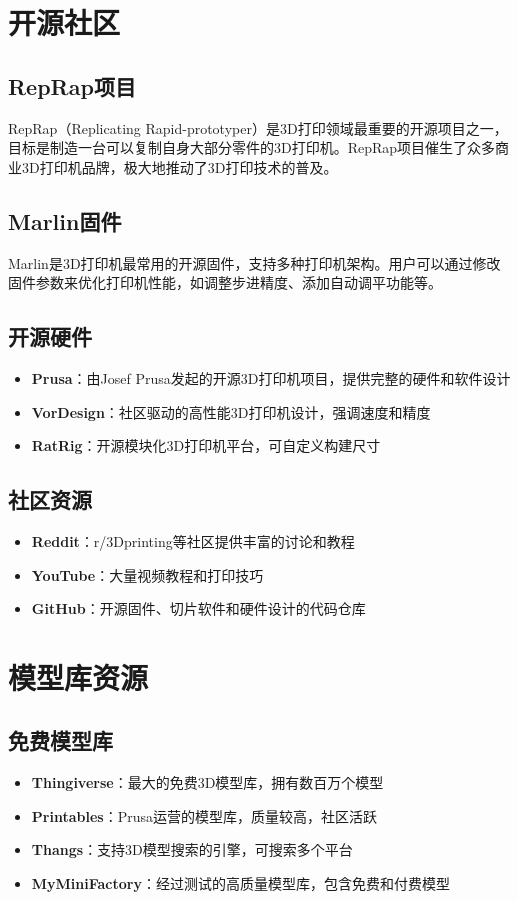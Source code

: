 \documentclass[12pt,UTF8]{ctexbook}
\begin{document}
\section{开源社区}

\subsection{RepRap项目}
RepRap（Replicating Rapid-prototyper）是3D打印领域最重要的开源项目之一，目标是制造一台可以复制自身大部分零件的3D打印机。RepRap项目催生了众多商业3D打印机品牌，极大地推动了3D打印技术的普及。

\subsection{Marlin固件}
Marlin是3D打印机最常用的开源固件，支持多种打印机架构。用户可以通过修改固件参数来优化打印机性能，如调整步进精度、添加自动调平功能等。

\subsection{开源硬件}
\begin{itemize}
\item \textbf{Prusa}：由Josef Prusa发起的开源3D打印机项目，提供完整的硬件和软件设计
\item \textbf{VorDesign}：社区驱动的高性能3D打印机设计，强调速度和精度
\item \textbf{RatRig}：开源模块化3D打印机平台，可自定义构建尺寸
\end{itemize}

\subsection{社区资源}
\begin{itemize}
\item \textbf{Reddit}：r/3Dprinting等社区提供丰富的讨论和教程
\item \textbf{YouTube}：大量视频教程和打印技巧
\item \textbf{GitHub}：开源固件、切片软件和硬件设计的代码仓库
\end{itemize}

\section{模型库资源}

\subsection{免费模型库}
\begin{itemize}
\item \textbf{Thingiverse}：最大的免费3D模型库，拥有数百万个模型
\item \textbf{Printables}：Prusa运营的模型库，质量较高，社区活跃
\item \textbf{Thangs}：支持3D模型搜索的引擎，可搜索多个平台
\item \textbf{MyMiniFactory}：经过测试的高质量模型库，包含免费和付费模型
\end{itemize}
\end{document}
